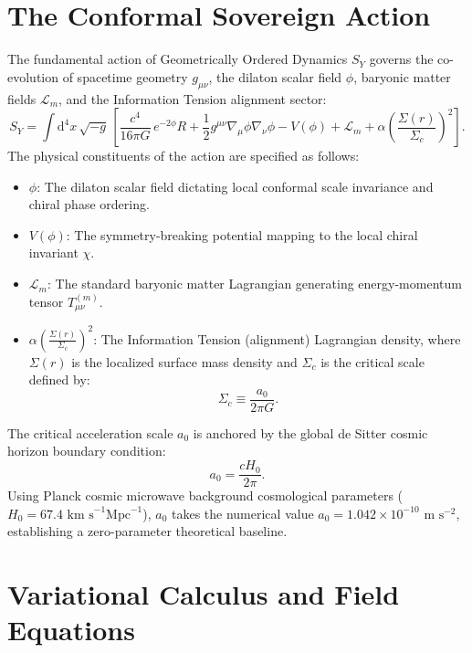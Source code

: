 \documentclass[11pt]{article}
\theoremstyle{definition}
\theoremstyle{remark}
\newcommand{\dd}{\mathrm{d}}
\begin{document}
\section{The Conformal Sovereign Action}

The fundamental action of Geometrically Ordered Dynamics $S_Y$ governs the co-evolution of spacetime geometry $g_{\mu\nu}$, the dilaton scalar field $\phi$, baryonic matter fields $\mathcal{L}_m$, and the Information Tension alignment sector:
\begin{equation}
S_Y = \int \dd^4x\,\sqrt{-g}\,\left[\frac{c^4}{16\pi G}\,e^{-2\phi}R + \frac{1}{2} g^{\mu\nu}\nabla_\mu\phi\nabla_\nu\phi - V(\phi) + \mathcal{L}_m + \alpha\left(\frac{\Sigma(r)}{\Sigma_c}\right)^2\right].
\end{equation}
The physical constituents of the action are specified as follows:
\begin{itemize}
    \item $\phi$: The dilaton scalar field dictating local conformal scale invariance and chiral phase ordering.
    \item $V(\phi)$: The symmetry-breaking potential mapping to the local chiral invariant $\chi$.
    \item $\mathcal{L}_m$: The standard baryonic matter Lagrangian generating energy-momentum tensor $T_{\mu\nu}^{(m)}$.
    \item $\alpha \left(\frac{\Sigma(r)}{\Sigma_c}\right)^2$: The Information Tension (alignment) Lagrangian density, where $\Sigma(r)$ is the localized surface mass density and $\Sigma_c$ is the critical scale defined by:
    \begin{equation}
    \Sigma_c \equiv \frac{a_0}{2\pi G}.
    \end{equation}
\end{itemize}
The critical acceleration scale $a_0$ is anchored by the global de Sitter cosmic horizon boundary condition:
\begin{equation}
a_0 = \frac{c H_0}{2\pi}.
\end{equation}
Using Planck cosmic microwave background cosmological parameters ($H_0 = 67.4\text{ km s}^{-1}\text{Mpc}^{-1}$), $a_0$ takes the numerical value $a_0 = 1.042 \times 10^{-10}\text{ m s}^{-2}$, establishing a zero-parameter theoretical baseline.

\section{Variational Calculus and Field Equations}
\end{document}
